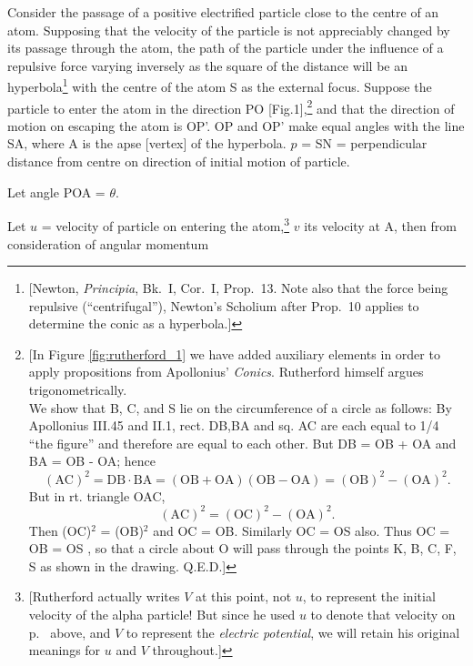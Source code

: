 Consider the passage of a positive electrified particle close to the
centre of an atom. Supposing that the velocity of the particle is not
appreciably changed by its passage through the atom, the path of the
particle under the influence of a repulsive force varying inversely as
the square of the distance will be an hyperbola\footnote{{[}Newton,
  \emph{Principia}, Bk.~I, Cor.~I, Prop.~13. Note also that the force being
  repulsive (``centrifugal''), Newton's Scholium after Prop.\ 10 applies
  to determine the conic as a hyperbola.{]}} with the centre of the atom
S as the external focus. Suppose the particle to enter the atom in the
direction PO {[}Fig.1{]},\footnote{{[}In Figure \ref{fig:rutherford_1} we have added
  auxiliary elements in order to apply propositions from Apollonius'
  \emph{Conics}. Rutherford himself argues trigonometrically.\\
  We show that B, C, and S lie on the circumference of a circle as follows: 
  By Apollonius III.45 and II.1,
  rect. DB,BA and sq. AC are each equal to 1/4 ``the figure'' and
  therefore are equal to each other. But DB = OB + OA and BA = OB - OA;
  hence\\
	\begin{equation*}
   (\text{AC})^2 = \text{DB} \cdot \text{BA} = (\text{OB} + \text{OA})(\text{OB} - \text{OA}) = (\text{OB})^2 - (\text{OA})^2 .
	\end{equation*}
  But in rt. triangle OAC,
  \begin{equation*}
  (\text{AC})^2 = (\text{OC})^2 - (\text{OA})^2 .
  \end{equation*}
  Then (OC)$^2$ = (OB)$^2$ and OC = OB. Similarly OC = OS also. Thus OC = OB =
  OS , so that a circle about O will pass through the points K, B, C, F,
  S as shown in the drawing. Q.E.D.{]}} and that the direction of motion
on escaping the atom is OP'. OP and OP' make equal angles with the line
SA, where A is the apse {[}vertex{]} of the hyperbola. $p$ = SN =
perpendicular distance from centre on direction of initial motion of
particle.

Let angle POA = $\theta$.

Let $u$ = velocity of particle on entering the atom,\footnote{{[}Rutherford
  actually writes $V$ at this point, not $u$, to represent the
  initial velocity of the alpha particle! But since he used $u$ to
  denote that velocity on p.~\pageref{s:rutherford_u} above, and $V$ to represent the
  \emph{electric potential}, we will retain his original meanings for
  $u$ and $V$ throughout.{]}} $v$ its velocity at A, then
from consideration of angular momentum

